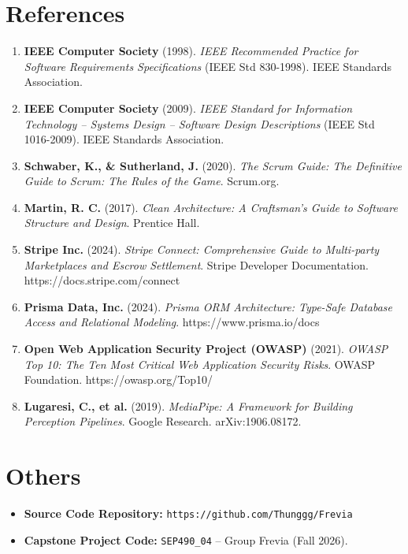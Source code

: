 \section{References}
\begin{enumerate}[leftmargin=1.2cm]
    \item \textbf{IEEE Computer Society} (1998). \textit{IEEE Recommended Practice for Software Requirements Specifications} (IEEE Std 830-1998). IEEE Standards Association.
    \item \textbf{IEEE Computer Society} (2009). \textit{IEEE Standard for Information Technology -- Systems Design -- Software Design Descriptions} (IEEE Std 1016-2009). IEEE Standards Association.
    \item \textbf{Schwaber, K., \& Sutherland, J.} (2020). \textit{The Scrum Guide: The Definitive Guide to Scrum: The Rules of the Game}. Scrum.org.
    \item \textbf{Martin, R. C.} (2017). \textit{Clean Architecture: A Craftsman's Guide to Software Structure and Design}. Prentice Hall.
    \item \textbf{Stripe Inc.} (2024). \textit{Stripe Connect: Comprehensive Guide to Multi-party Marketplaces and Escrow Settlement}. Stripe Developer Documentation. https://docs.stripe.com/connect
    \item \textbf{Prisma Data, Inc.} (2024). \textit{Prisma ORM Architecture: Type-Safe Database Access and Relational Modeling}. https://www.prisma.io/docs
    \item \textbf{Open Web Application Security Project (OWASP)} (2021). \textit{OWASP Top 10: The Ten Most Critical Web Application Security Risks}. OWASP Foundation. https://owasp.org/Top10/
    \item \textbf{Lugaresi, C., et al.} (2019). \textit{MediaPipe: A Framework for Building Perception Pipelines}. Google Research. arXiv:1906.08172.
\end{enumerate}

\section{Others}
\begin{itemize}[leftmargin=1.2cm]
    \item \textbf{Source Code Repository:} \texttt{https://github.com/Thunggg/Frevia}
    \item \textbf{Capstone Project Code:} \texttt{SEP490\_04} -- Group Frevia (Fall 2026).
\end{itemize}
